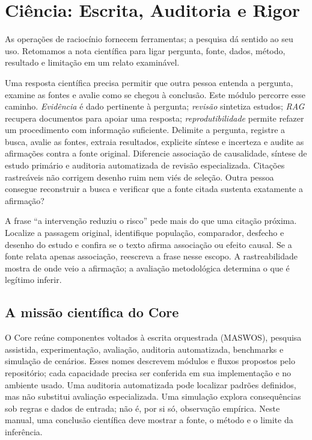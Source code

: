\chapter{Ciência: Escrita, Auditoria e Rigor}

As operações de raciocínio fornecem ferramentas; a pesquisa dá sentido ao seu uso. Retomamos a nota científica para ligar pergunta, fonte, dados, método, resultado e limitação em um relato examinável.


\roteirodidatico
{Uma resposta científica precisa permitir que outra pessoa entenda a pergunta, examine as fontes e avalie como se chegou à conclusão. Este módulo percorre esse caminho.}
{\emph{Evidência} é dado pertinente à pergunta; \emph{revisão} sintetiza estudos; \emph{RAG} recupera documentos para apoiar uma resposta; \emph{reprodutibilidade} permite refazer um procedimento com informação suficiente.}
{Delimite a pergunta, registre a busca, avalie as fontes, extraia resultados, explicite síntese e incerteza e audite as afirmações contra a fonte original.}
{Diferencie associação de causalidade, síntese de estudo primário e auditoria automatizada de revisão especializada. Citações rastreáveis não corrigem desenho ruim nem viés de seleção.}
{Outra pessoa consegue reconstruir a busca e verificar que a fonte citada sustenta exatamente a afirmação?}

{A frase ``a intervenção reduziu o risco'' pede mais do que uma citação próxima. Localize a passagem original, identifique população, comparador, desfecho e desenho do estudo e confira se o texto afirma associação ou efeito causal. Se a fonte relata apenas associação, reescreva a frase nesse escopo. A rastreabilidade mostra de onde veio a afirmação; a avaliação metodológica determina o que é legítimo inferir.}

\section{A missão científica do Core}


\begin{descricao}
O Core reúne componentes voltados à escrita orquestrada (MASWOS), pesquisa
assistida, experimentação, avaliação, auditoria automatizada, benchmarks e
simulação de cenários. Esses nomes descrevem módulos e fluxos propostos pelo
repositório; cada capacidade precisa ser conferida em sua implementação e no
ambiente usado. Uma auditoria automatizada pode localizar padrões definidos,
mas não substitui avaliação especializada. Uma simulação explora consequências
sob regras e dados de entrada; não é, por si só, observação empírica. Neste
manual, uma conclusão científica deve mostrar a fonte, o método e o limite da
inferência.
\end{descricao}

